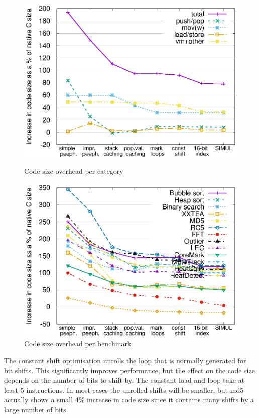 \begin{figure}
 \centering
 \begin{minipage}{0.45\textwidth}
  \centering
  \includegraphics[width=\myfiguresizecodesize]{codesizeoverhead-per-opcode-category.eps}
  \caption{Code size overhead per category}
  \label{fig-codesize-per-opcode-category}
 \end{minipage}\hfill
 \begin{minipage}{0.45\textwidth}
  \centering
  \includegraphics[width=\myfiguresizecodesize]{codesizeoverhead-per-benchmark.eps}
  \caption{Code size overhead per benchmark}
  \label{fig-codesize-per-benchmark}
 \end{minipage}
\end{figure}

The constant shift optimisation unrolls the loop that is normally generated for bit shifts. This significantly improves performance, but the effect on the code size depends on the number of bits to shift by. The constant load and loop take at least 5 instructions. In most cases the unrolled shifts will be smaller, but md5 actually shows a small 4\% increase in code size since it contains many shifts by a large number of bits.

